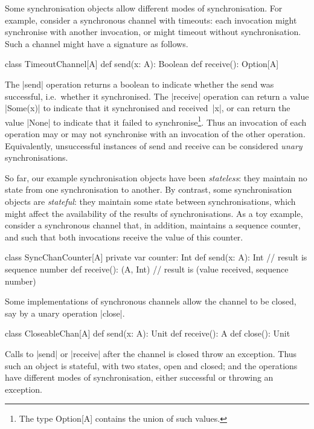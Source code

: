 Some synchronisation objects allow different modes of synchronisation.  For
example, consider a synchronous channel with timeouts: each invocation might
synchronise with another invocation, or might timeout without
synchronisation.  Such a channel might have a signature as follows.
%
\begin{scala}
class TimeoutChannel[A]{
  def send(x: A): Boolean
  def receive(): Option[A]
}
\end{scala}
%
The |send| operation returns a boolean to indicate whether the send was
successful, i.e.~whether it synchronised.  The |receive| operation can return
a value |Some(x)| to indicate that it synchronised and received~|x|, or can
return the value |None| to indicate that it failed to synchronise\footnote{The
  type {\scalashape Option[A]} contains the union of such values.}.  Thus an
invocation of each operation may or may not synchronise with an invocation of
the other operation.  Equivalently, unsuccessful instances of send and receive
can be considered \emph{unary} synchronisations.  

So far, our example synchronisation objects have been \emph{stateless}: they
maintain no state from one synchronisation to another.  By contrast, some
synchronisation objects are \emph{stateful}: they maintain some state between
synchronisations, which might affect the availability of the results of
synchronisations.  As a toy example, consider a synchronous channel that, in
addition, maintains a sequence counter, and such that both invocations receive
the value of this counter.
\begin{scala}
class SyncChanCounter[A]{
  private var counter: Int
  def send(x: A): Int      // result is sequence number
  def receive(): (A, Int)  // result is (value received, sequence number)
}
\end{scala}


Some implementations of synchronous channels allow the channel to be closed,
say by a unary operation |close|. 
\begin{scala}
class CloseableChan[A]{
  def send(x: A): Unit
  def receive(): A
  def close(): Unit
}
\end{scala} 
%
Calls to |send| or |receive| after the channel is closed throw an exception.
Thus such an object is stateful, with two states, open and closed; and the
operations have different modes of synchronisation, either successful or
throwing an exception.



